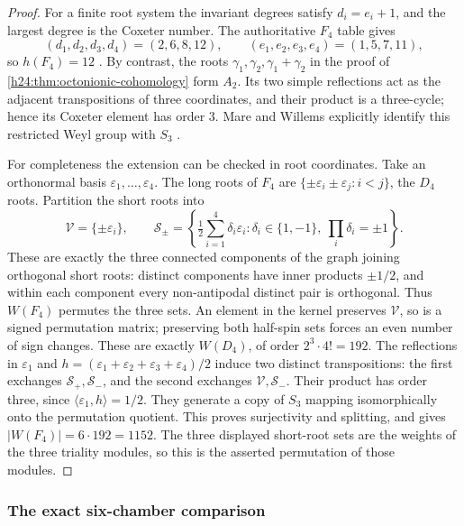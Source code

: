 \begin{proof}
For a finite root system the invariant degrees satisfy \(d_i=e_i+1\),
and the largest degree is the Coxeter number.  The authoritative \(F_4\)
table gives
\[
 (d_1,d_2,d_3,d_4)=(2,6,8,12),
 \qquad(e_1,e_2,e_3,e_4)=(1,5,7,11),
\]
so \(h(F_4)=12\)
\cite[Section~10.1, p.~213, and the table on p.~216]
{h24:KomoriMatsumotoTsumura2023}.  By contrast, the roots
\(\gamma_1,\gamma_2,\gamma_1+\gamma_2\) in the proof of
\cref{h24:thm:octonionic-cohomology} form \(A_2\).  Its two simple reflections
act as the adjacent transpositions of three coordinates, and their product
is a three-cycle; hence its Coxeter element has order \(3\).
Mare and Willems explicitly identify this restricted Weyl group with
\(S_3\) \cite[pp.~492--493]{h24:MareWillems2013}.

For completeness the extension can be checked in root coordinates.
Take an orthonormal basis \(\varepsilon_1,\ldots,\varepsilon_4\).
The long roots of \(F_4\) are
\(\{\pm\varepsilon_i\pm\varepsilon_j:i<j\}\), the \(D_4\) roots.
Partition the short roots into
\[
 \mathcal V=\{\pm\varepsilon_i\},\qquad
 \mathcal S_\pm=
 \left\{\tfrac12\sum_{i=1}^4\delta_i\varepsilon_i:
           \delta_i\in\{1,-1\},\ \prod_i\delta_i=\pm1\right\}.
\]
These are exactly the three connected components of the graph joining
orthogonal short roots: distinct components have inner products
\(\pm1/2\), and within each component every non-antipodal distinct pair
is orthogonal.  Thus \(W(F_4)\) permutes the three sets.  An element in
the kernel preserves \(\mathcal V\), so is a signed permutation matrix;
preserving both half-spin sets forces an even number of sign changes.
These are exactly \(W(D_4)\), of order \(2^3\cdot4!=192\).
The reflections in \(\varepsilon_1\) and
\(h=(\varepsilon_1+\varepsilon_2+\varepsilon_3+\varepsilon_4)/2\)
induce two distinct transpositions: the first exchanges
\(\mathcal S_+,\mathcal S_-\), and the second exchanges
\(\mathcal V,\mathcal S_-\).  Their product has order three, since
\(\langle\varepsilon_1,h\rangle=1/2\).  They generate a copy of
\(S_3\) mapping isomorphically onto the permutation quotient.  This proves
surjectivity and splitting, and gives \(|W(F_4)|=6\cdot192=1152\).
The three displayed short-root sets are the weights of the three triality
modules, so this is the asserted permutation of those modules.
\end{proof}

\subsubsection{The exact six-chamber comparison}

